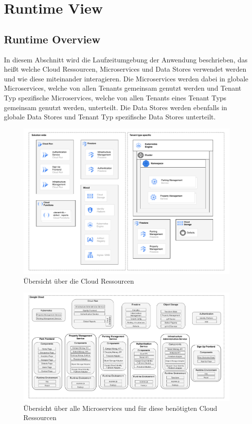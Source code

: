 \section{Runtime View}
\subsection{Runtime Overview}
In diesem Abschnitt wird die Laufzeitumgebung der Anwendung beschrieben, das heißt welche Cloud Ressourcen, Microservices und Data Stores verwendet werden und wie diese miteinander interagieren.
Die Microservices werden dabei in globale Microservices, welche von allen Tenants gemeinsam genutzt werden und Tenant Typ spezifische Microservices, welche von allen Tenants eines Tenant Typs gemeinsam genutzt werden, unterteilt.
Die Data Stores werden ebenfalls in globale Data Stores und Tenant Typ spezifische Data Stores unterteilt.

\begin{figure}[H]
	\centering
	\includegraphics[width=\textwidth]{resources/03-runtime-view/pdf/cloud-ressources.pdf}
	\caption{Übersicht über die Cloud Ressourcen}
	\label{fig:cloud-ressources}
\end{figure}

\begin{figure}[H]
	\centering
	\includegraphics[width=\textwidth]{resources/03-runtime-view/pdf/architecture.pdf}
	\caption{Übersicht über alle Microservices und für diese benötigten Cloud Ressourcen}
	\label{fig:system-architecture}
\end{figure}

